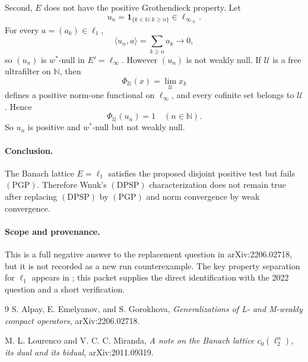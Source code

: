 \documentclass[11pt]{article}
\newcommand{\ellone}{\ell_1}
\newcommand{\ellinf}{\ell_\infty}
\newcommand{\N}{\mathbb{N}}
\newcommand{\wstar}{w^\ast}
\begin{document}
Second, \(E\) does not have the positive Grothendieck property.  Let
\[
  u_n=\mathbf{1}_{\{k\in\N:k\ge n\}}\in{\ellinf}_+.
\]
For every \(a=(a_k)\in\ellone\),
\[
  \langle u_n,a\rangle=\sum_{k\ge n} a_k\to0,
\]
so \((u_n)\) is \(\wstar\)-null in \(E'=\ellinf\).  However \((u_n)\) is not
weakly null.  If \(\mathcal U\) is a free ultrafilter on \(\N\), then
\[
  \Phi_{\mathcal U}(x)=\lim_{\mathcal U} x_k
\]
defines a positive norm-one functional on \(\ellinf\), and every cofinite set
belongs to \(\mathcal U\).  Hence
\[
  \Phi_{\mathcal U}(u_n)=1\quad(n\in\N).
\]
So \(u_n\) is positive and \(\wstar\)-null but not weakly null.

\paragraph{Conclusion.}
The Banach lattice \(E=\ellone\) satisfies the proposed disjoint positive test
but fails \((\mathrm{PGP})\).  Therefore Wnuk's \((\mathrm{DPSP})\)
characterization does not remain true after replacing \((\mathrm{DPSP})\) by
\((\mathrm{PGP})\) and norm convergence by weak convergence.

\paragraph{Scope and provenance.}
This is a full negative answer to the replacement question in arXiv:2206.02718,
but it is not recorded as a new run counterexample.  The key property separation
for \(\ellone\) appears in \cite{LM}; this packet supplies the direct
identification with the 2022 question and a short verification.

\begin{thebibliography}{9}
S. Alpay, E. Emelyanov, and S. Gorokhova,
\emph{Generalizations of L- and M-weakly compact operators},
arXiv:2206.02718.

M. L. Lourenco and V. C. C. Miranda,
\emph{A note on the Banach lattice \(c_0(\ell_2^n)\), its dual and its bidual},
arXiv:2011.09319.
\end{thebibliography}
\end{document}
